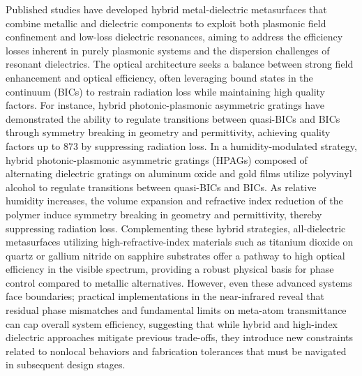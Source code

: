 \documentclass[11pt]{article}
\begin{document}
Published studies have developed hybrid metal-dielectric metasurfaces that combine metallic and dielectric components to exploit both plasmonic field confinement and low-loss dielectric resonances, aiming to address the efficiency losses inherent in purely plasmonic systems and the dispersion challenges of resonant dielectrics. The optical architecture seeks a balance between strong field enhancement and optical efficiency, often leveraging bound states in the continuum (BICs) to restrain radiation loss while maintaining high quality factors. For instance, hybrid photonic-plasmonic asymmetric gratings have demonstrated the ability to regulate transitions between quasi-BICs and BICs through symmetry breaking in geometry and permittivity, achieving quality factors up to 873 by suppressing radiation loss. In a humidity-modulated strategy, hybrid photonic-plasmonic asymmetric gratings (HPAGs) composed of alternating dielectric gratings on aluminum oxide and gold films utilize polyvinyl alcohol to regulate transitions between quasi-BICs and BICs. As relative humidity increases, the volume expansion and refractive index reduction of the polymer induce symmetry breaking in geometry and permittivity, thereby suppressing radiation loss. \citep{doi_10_1002_adpr_202400191_88f03cd9} Complementing these hybrid strategies, all-dielectric metasurfaces utilizing high-refractive-index materials such as titanium dioxide on quartz or gallium nitride on sapphire substrates offer a pathway to high optical efficiency in the visible spectrum, providing a robust physical basis for phase control compared to metallic alternatives. However, even these advanced systems face boundaries; practical implementations in the near-infrared reveal that residual phase mismatches and fundamental limits on meta-atom transmittance can cap overall system efficiency, suggesting that while hybrid and high-index dielectric approaches mitigate previous trade-offs, they introduce new constraints related to nonlocal behaviors and fabrication tolerances that must be navigated in subsequent design stages. \citep{doi_10_1002_adpr_202400191_88f03cd9} \citep{doi_10_1063_5_0141881_93942631}
\end{document}
